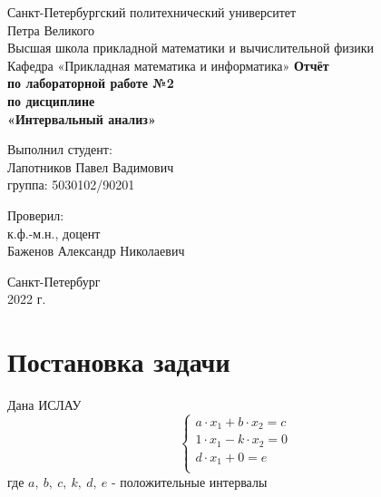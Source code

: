 \documentclass[12pt,a4paper]{article}
\begin{document}
	\begin{titlepage}
		\begin{center}		
			\vfill	
			Санкт-Петербургский политехнический университет \\
			Петра Великого\\
			\vskip 1cm
			Высшая школа прикладной математики и вычислительной физики \\
			Кафедра «Прикладная математика и информатика»
			\vfill
			\textbf{Отчёт\\
				по лабораторной работе №2\\
				по дисциплине\\
				«Интервальный анализ»\\}
			\vfill
		\end{center}
		\vfill
		\hfill
		\begin{minipage}{0.4\textwidth}
			Выполнил студент:\\
			Лапотников Павел Вадимович\\
			группа: 5030102/90201\\
		\end{minipage}
		\vfill
		\hfill 
		\begin{minipage}{0.4\textwidth}
			Проверил:\\
			к.ф.-м.н., доцент\\
			Баженов Александр Николаевич\
		\end{minipage}
		\vfill
		\hfill 
		\begin{center}
			Санкт-Петербург\\2022 г.
		\end{center}
	\end{titlepage}
	
	\tableofcontents
	\listoffigures
	\pagebreak
    	
    	
    \section{Постановка задачи}
        Дана ИСЛАУ 
        \begin{equation}\label{islau_initial}
            \begin{cases}
            a\cdot x_1+b\cdot x_2=c\\
            1 \cdot x_1 - k\cdot x_2=0\\
            d\cdot x_1 + 0=e\\
            \end{cases}
        \end{equation}
        где $a, \: b, \: c, \: k, \: d, \: e$ - положительные интервалы
        
\end{document}
